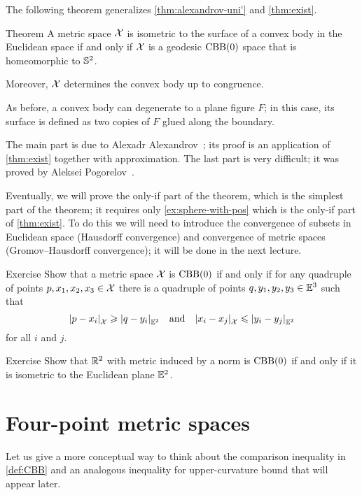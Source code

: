The following theorem generalizes \ref{thm:alexandrov-uni'} and \ref{thm:exist}.

\begin{thm}{Theorem}\label{thm:alexandrov+pogorelov}
A metric space $\mathcal{X}$ is isometric to the surface of a convex body in the Euclidean space if and only if $\mathcal{X}$ is a geodesic $\mathrm{CBB}(0)$ space that is homeomorphic to $\mathbb{S}^2$.

Moreover, $\mathcal{X}$ determines the convex body up to congruence.
\end{thm}

As before, a convex body can degenerate to a plane figure $F$;
in this case, its surface is defined as two copies of $F$ glued along the boundary.

The main part is due to Alexadr Alexandrov~\cite{alexandrov-1948};
its proof is an application of \ref{thm:exist} together with approximation.
The last part is very difficult; it was proved by Aleksei Pogorelov~\cite{pogorelov}.

Eventually, we will prove the only-if part of the theorem, which is the simplest part of the theorem;
it requires only \ref{ex:sphere-with-pos} which is
the only-if part of \ref{thm:exist}.
To do this we will need to introduce the convergence of subsets in Euclidean space (Hausdorff convergence) and convergence of metric spaces (Gromov--Hausdorff convergence); it will be done in the next lecture.

\begin{thm}{Exercise}\label{ex:(3+1)-expanding}
Show that a metric space $\mathcal{X}$ is $\mathrm{CBB}(0)$
if and only if for any quadruple of points $p,x_1,x_2,x_3\in \mathcal{X}$ 
there is a quadruple of points $q,y_1,y_2,y_3\in\mathbb{E}^3$
such that 
\[\dist{p}{x_i}{\spc{X}}\ge\dist{q}{y_i}{\EE^2} 
\quad \text{and}\quad
\dist{x_i}{x_j}{\spc{X}}\le\dist{y_i}{y_j}{\EE^2}\] 
for all $i$ and $j$.
\end{thm}

\begin{thm}{Exercise}\label{ex:normCBB}
Show that $\mathbb{R}^2$ with metric induced by a norm is $\mathrm{CBB}(0)$ if and only if it is isometric to the Euclidean plane $\mathbb{E}^2$.
\end{thm}

\section{Four-point metric spaces}

Let us give a more conceptual way to think about the comparison inequality in \ref{def:CBB} and an analogous inequality for upper-curvature bound that will appear later.


